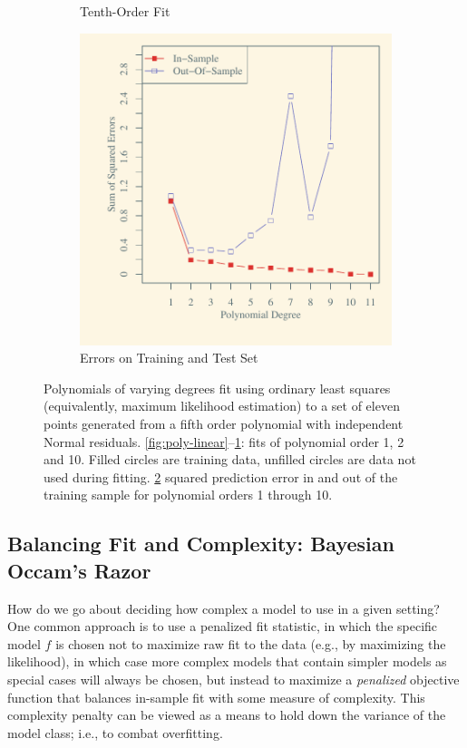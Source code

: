 \begin{figure}[t!]
\begin{subfigure}[t]{0.33\textwidth}
        \caption{Tenth-Order Fit \label{fig:poly10}}
    \end{subfigure}
    \begin{subfigure}[t]{0.5\textwidth}
        \centering
        \includegraphics[width=\textwidth]{fig/poly_errors}
        \caption{Errors on Training and Test Set \label{fig:poly-errors}}
    \end{subfigure}
    \caption{\label{fig:polynomials} Polynomials of varying degrees fit using ordinary least
      squares (equivalently, maximum likelihood estimation) 
      to a set of eleven points generated from a fifth order
      polynomial with independent Normal
      residuals. \ref{fig:poly-linear}--\ref{fig:poly10}: fits of
      polynomial order 1, 2 and 10.  Filled circles are training data,
    unfilled circles are data not used during fitting.
    \ref{fig:poly-errors} squared prediction error in and out of the
    training sample for polynomial orders 1 through 10.}
\end{figure}

\subsection{Balancing Fit and Complexity: Bayesian Occam's Razor}
\label{sec:balanc-fit-compl}

How do we go about deciding how complex a model to use in a given
setting?  One common approach is to use a penalized fit statistic, in
which the specific model $f$ is chosen not to maximize raw fit to the
data (e.g., by maximizing the likelihood), in which case more complex
models that contain simpler models as special cases will always be
chosen, but instead to maximize a {\em penalized} objective function
that balances in-sample fit with some measure of complexity.  This
complexity penalty can be viewed as a means to hold down the variance
of the model class; i.e., to combat overfitting.

